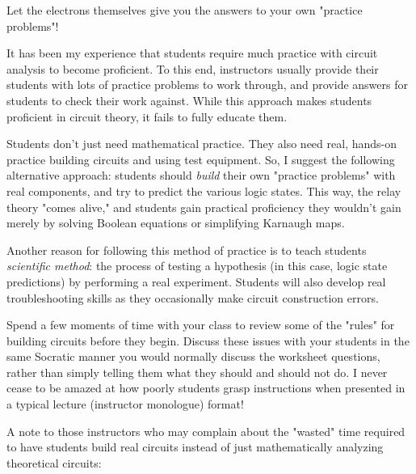 





Let the electrons themselves give you the answers to your own "practice problems"!







It has been my experience that students require much practice with circuit analysis to become proficient.  To this end, instructors usually provide their students with lots of practice problems to work through, and provide answers for students to check their work against.  While this approach makes students proficient in circuit theory, it fails to fully educate them.

Students don't just need mathematical practice.  They also need real, hands-on practice building circuits and using test equipment.  So, I suggest the following alternative approach: students should {\it build} their own "practice problems" with real components, and try to predict the various logic states.  This way, the relay theory "comes alive," and students gain practical proficiency they wouldn't gain merely by solving Boolean equations or simplifying Karnaugh maps.

Another reason for following this method of practice is to teach students {\it scientific method}: the process of testing a hypothesis (in this case, logic state predictions) by performing a real experiment.  Students will also develop real troubleshooting skills as they occasionally make circuit construction errors.

Spend a few moments of time with your class to review some of the "rules" for building circuits before they begin.  Discuss these issues with your students in the same Socratic manner you would normally discuss the worksheet questions, rather than simply telling them what they should and should not do.  I never cease to be amazed at how poorly students grasp instructions when presented in a typical lecture (instructor monologue) format!

\vskip 10pt

A note to those instructors who may complain about the "wasted" time required to have students build real circuits instead of just mathematically analyzing theoretical circuits:

\vskip 10pt


